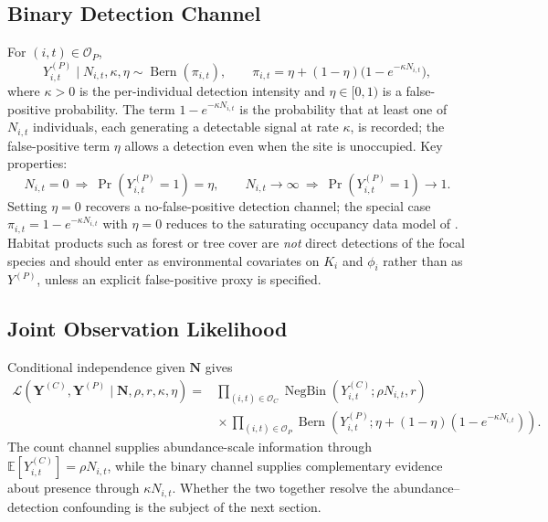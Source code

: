 \documentclass[preprint,12pt]{elsarticle}
\theoremstyle{definition}
\newcommand{\E}{\mathbb{E}}
\newcommand{\Bern}{\operatorname{Bern}}
\newcommand{\NB}{\operatorname{NegBin}}
\newcommand{\OC}{\mathcal{O}_C}
\newcommand{\OP}{\mathcal{O}_P}
\begin{document}
\subsection{Binary Detection Channel}

For $(i,t)\in\OP$,
\begin{equation}
  Y^{(P)}_{i,t}\mid N_{i,t},\kappa,\eta
  \sim\Bern(\pi_{i,t}),\qquad
  \pi_{i,t}=\eta+(1-\eta)\bigl(1-e^{-\kappa N_{i,t}}\bigr),
  \label{eq:binary-channel}
\end{equation}
where $\kappa>0$ is the per-individual detection intensity and
$\eta\in[0,1)$ is a false-positive probability. The term
$1-e^{-\kappa N_{i,t}}$ is the probability that at least one of $N_{i,t}$
individuals, each generating a detectable signal at rate $\kappa$, is
recorded; the false-positive term $\eta$ allows a detection even when the
site is unoccupied. Key properties:
\begin{equation}
  N_{i,t}=0\ \Rightarrow\ \Pr(Y^{(P)}_{i,t}=1)=\eta,
  \qquad
  N_{i,t}\to\infty\ \Rightarrow\ \Pr(Y^{(P)}_{i,t}=1)\to1 .
  \label{eq:binary-props}
\end{equation}
Setting $\eta=0$ recovers a no-false-positive detection channel; the
special case $\pi_{i,t}=1-e^{-\kappa N_{i,t}}$ with $\eta=0$ reduces to the
saturating occupancy data model of \citet{hooten2010}. Habitat products
such as forest or tree cover are \emph{not} direct detections of the focal
species and should enter as environmental covariates on $K_i$ and $\phi_i$
rather than as $Y^{(P)}$, unless an explicit false-positive proxy is
specified.

\subsection{Joint Observation Likelihood}

Conditional independence given $\mathbf{N}$ gives
\begin{equation}
\begin{aligned}
  \mathcal{L}\!\left(\mathbf{Y}^{(C)},\mathbf{Y}^{(P)}
    \mid\mathbf{N},\rho,r,\kappa,\eta\right)
  ={}&\prod_{(i,t)\in\OC}
    \NB\!\left(Y^{(C)}_{i,t};\rho N_{i,t},r\right)\\
  &{}\times\prod_{(i,t)\in\OP}
    \Bern\!\left(Y^{(P)}_{i,t};
      \eta+(1-\eta)(1-e^{-\kappa N_{i,t}})\right).
\end{aligned}
  \label{eq:joint-likelihood}
\end{equation}
The count channel supplies abundance-scale information through
$\E[Y^{(C)}_{i,t}]=\rho N_{i,t}$, while the binary channel supplies
complementary evidence about presence through $\kappa N_{i,t}$. Whether the
two together resolve the abundance--detection confounding is the subject of
the next section.
\end{document}
